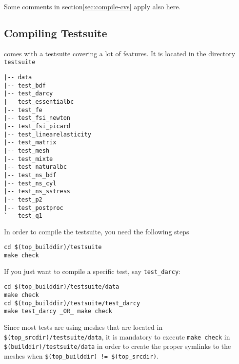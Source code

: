 Some comments in section\ref{sec:compile-cvs} apply also here.

\subsection{Compiling Testsuite}

\noindent \lifev comes with a testsuite covering a lot of features. It is located in the directory \verb+testsuite+
\begin{verbatim}
|-- data
|-- test_bdf
|-- test_darcy
|-- test_essentialbc
|-- test_fe
|-- test_fsi_newton
|-- test_fsi_picard
|-- test_linearelasticity
|-- test_matrix
|-- test_mesh
|-- test_mixte
|-- test_naturalbc
|-- test_ns_bdf
|-- test_ns_cyl
|-- test_ns_sstress
|-- test_p2
|-- test_postproc
`-- test_q1
\end{verbatim}

\noindent In order to compile the testsuite, you need the following steps
\begin{verbatim}
cd $(top_builddir)/testsuite
make check
\end{verbatim}

\noindent If you just want to compile a specific test, say \verb+test_darcy+:
\begin{verbatim}
cd $(top_builddir)/testsuite/data 
make check
cd $(top_builddir)/testsuite/test_darcy
make test_darcy _OR_ make check
\end{verbatim}

\noindent Since most tests are using meshes that are located in
\verb+$(top_srcdir)/testsuite/data+, it is mandatory to execute \verb+make check+ in
\verb+$(builddir)/testsuite/data+ in order to create the proper
symlinks to the meshes when \verb+$(top_builddir) != $(top_srcdir)+.

%
%
